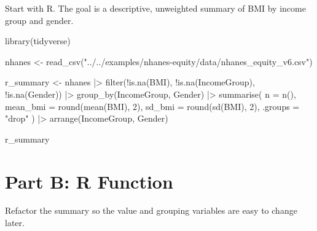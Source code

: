 \documentclass[
  letterpaper,
  DIV=11,
  numbers=noendperiod,
  oneside]{scrreprt}
\newenvironment{Shaded}{\begin{snugshade}}{\end{snugshade}}
\newcommand{\AttributeTok}[1]{\textcolor[rgb]{0.40,0.45,0.13}{#1}}
\newcommand{\DecValTok}[1]{\textcolor[rgb]{0.68,0.00,0.00}{#1}}
\newcommand{\FunctionTok}[1]{\textcolor[rgb]{0.28,0.35,0.67}{#1}}
\newcommand{\NormalTok}[1]{\textcolor[rgb]{0.00,0.23,0.31}{#1}}
\newcommand{\OtherTok}[1]{\textcolor[rgb]{0.00,0.23,0.31}{#1}}
\newcommand{\SpecialCharTok}[1]{\textcolor[rgb]{0.37,0.37,0.37}{#1}}
\newcommand{\StringTok}[1]{\textcolor[rgb]{0.13,0.47,0.30}{#1}}
\begin{document}
Start with R. The goal is a descriptive, unweighted summary of BMI by
income group and gender.

\begin{Shaded}
\begin{Highlighting}[numbers=left,,]
\FunctionTok{library}\NormalTok{(tidyverse)}

\NormalTok{nhanes }\OtherTok{\textless{}{-}} \FunctionTok{read\_csv}\NormalTok{(}\StringTok{"../../examples/nhanes{-}equity/data/nhanes\_equity\_v6.csv"}\NormalTok{)}

\NormalTok{r\_summary }\OtherTok{\textless{}{-}}\NormalTok{ nhanes }\SpecialCharTok{|\textgreater{}}
  \FunctionTok{filter}\NormalTok{(}\SpecialCharTok{!}\FunctionTok{is.na}\NormalTok{(BMI), }\SpecialCharTok{!}\FunctionTok{is.na}\NormalTok{(IncomeGroup), }\SpecialCharTok{!}\FunctionTok{is.na}\NormalTok{(Gender)) }\SpecialCharTok{|\textgreater{}}
  \FunctionTok{group\_by}\NormalTok{(IncomeGroup, Gender) }\SpecialCharTok{|\textgreater{}}
  \FunctionTok{summarise}\NormalTok{(}
    \AttributeTok{n =} \FunctionTok{n}\NormalTok{(),}
    \AttributeTok{mean\_bmi =} \FunctionTok{round}\NormalTok{(}\FunctionTok{mean}\NormalTok{(BMI), }\DecValTok{2}\NormalTok{),}
    \AttributeTok{sd\_bmi =} \FunctionTok{round}\NormalTok{(}\FunctionTok{sd}\NormalTok{(BMI), }\DecValTok{2}\NormalTok{),}
    \AttributeTok{.groups =} \StringTok{"drop"}
\NormalTok{  ) }\SpecialCharTok{|\textgreater{}}
  \FunctionTok{arrange}\NormalTok{(IncomeGroup, Gender)}

\NormalTok{r\_summary}
\end{Highlighting}
\end{Shaded}

\section{Part B: R Function}\label{part-b-r-function}

Refactor the summary so the value and grouping variables are easy to
change later.
\end{document}
